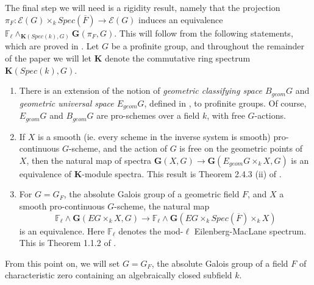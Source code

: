 \documentclass[11pt]{article}
\newcommand\mb{\mathbb}
\newcommand\mc{\mathcal}
\def \bK{\mathbf K}
\newcommand\mfk{\mathbf G}
\begin{document}
The final step we will need is a rigidity result, namely that the projection $\pi _F: \mc{E}(G) \times _k Spec(\overline{F}) \rightarrow \mc{E}(G) $ induces an equivalence 
 $\mb{F}_{\ell} \wedge _{\bK(Spec(k),G)} \mfk(\pi _F, G) $. This will follow from the following statements, which are proved in \cite{royg4}. Let $G$ be a profinite group, and throughout the remainder of the paper we will let $\bK$ denote the commutative ring spectrum $\bK(Spec(k),G)$.    

 \begin{enumerate} 
 \item{There is an extension of the notion of {\em geometric classifying space $B_{geom}G$} and {\em geometric universal space $E_{geom} G$},  defined in \cite{motivichomotopy},  to profinite groups.  Of course, $E_{geom}G$ and $B_{geom}G$ are pro-schemes over a field $k$, with free $G$-actions. }
 \item{\label{hinvariance} If $X$ is a smooth (ie. every scheme in the inverse system is smooth)  pro-continuous $G$-scheme, and the action of $G$  is free on the geometric points of $X$, then the natural map of spectra 
 $\mfk (X,G) \rightarrow \mfk (E_{geom}G \times _k  X,G) $ is an equivalence of $\bK$-module spectra.  This result is  Theorem 2.4.3 (ii) of \cite{royg4}. }
 \item{\label{h2invariance}For $G = G_F$, the absolute Galois group of a geometric field $F$, and $X$ a smooth pro-continuous $G$-scheme, the natural map 
 $$  \mb{F}_{\ell} \wedge \mfk( EG \times_k  X, G) \rightarrow \mb{F}_{\ell} \wedge \mfk(EG \times_k  Spec(\overline{F}) \times_k  X) 
    $$} is an equivalence.  Here $\mb{F}_{\ell} $ denotes the mod-$\ell$ Eilenberg-MacLane spectrum.  This is Theorem 1.1.2 of \cite{royg4}. 
 
 \end{enumerate} 
 From this point on, we will set $G = G_F$, the absolute Galois group of a field $F$ of characteristic zero containing an algebraically closed subfield $k$.  
\end{document}
